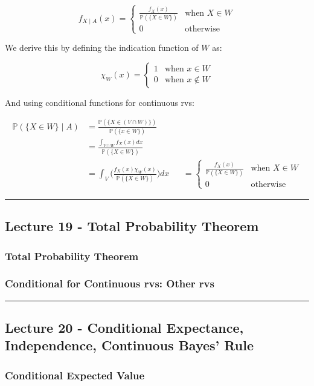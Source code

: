 \documentclass{article}
\begin{document}
\[
  f_{X\mid A}(x) =
  \begin{cases}
    \frac{f_X(x)} {\mathbb{P}(\{X\in W\})} & \text{when } X\in W \\
    0 & \text{otherwise}
  \end{cases}
\]

We derive this by defining the indication function of $W$ as:

\[
  \chi_W(x) =
  \begin{cases}
    1 & \text{when } x\in W \\
    0 & \text{when } x\not\in W
  \end{cases}
\]

And using conditional functions for continuous rvs:

\[
  \begin{aligned}
    \mathbb{P}(\{X\in W\}\mid A)
    &= \frac{\mathbb{P}(\{X\in (V\cap W)\})} {\mathbb{P}(\{x\in W\})} \\
    &= \frac{\int_{V\cap W}f_X(x)dx} {\mathbb{P}(\{X\in W\})} \\
    &= \int_V\bigg(\frac{f_X(x)\chi_W(x)} {\mathbb{P}(\{X\in W\})}\bigg) dx
    &&= \begin{cases}
      \frac{f_X(x)} {\mathbb{P}(\{X\in W\})} & \text{when } X\in W \\
      0 & \text{otherwise}
    \end{cases}
  \end{aligned}
\]


\medskip\hrule
\subsection{Lecture 19 - Total Probability Theorem}

\subsubsection{Total Probability Theorem}

\subsubsection{Conditional for Continuous rvs: Other rvs}


\medskip\hrule
\subsection{Lecture 20 - Conditional Expectance, Independence,
  Continuous Bayes' Rule}

\subsubsection{Conditional Expected Value}
\end{document}
